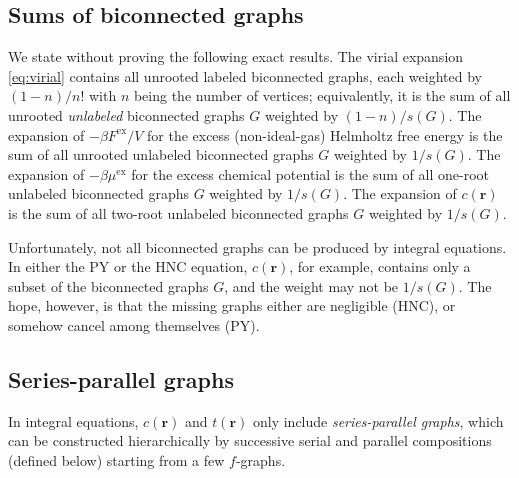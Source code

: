 \documentclass[preprint]{revtex4-1}
\newcommand{\vct}[1]{\mathbf{#1}}
\providecommand{\vr}{} %
\renewcommand{\vr}{\vct{r}}
\newcommand{\supex}[1]{ { { #1 }^{ \mathrm{ex} } } }
\newcommand{\Fex}{\supex{F}}
\newcommand{\muex}{\supex{\mu}}
\begin{document}
\subsection{\label{sec:bcsums}Sums of biconnected graphs}

We state without proving the following exact results\cite{hansen, mayer, uhlenbeck1962}.
%
The virial expansion \eqref{eq:virial} contains
  all unrooted labeled biconnected graphs,
  each weighted by $(1-n)/n!$ with $n$ being the number of vertices;
%
equivalently, it is the sum of
  all unrooted \emph{unlabeled} biconnected graphs $G$
  weighted by $(1-n)/s(G)$.
%
The expansion of $-\beta \Fex/V$
  for the excess (non-ideal-gas) Helmholtz free energy
  is the sum of all unrooted unlabeled biconnected graphs $G$
  weighted by $1/s(G)$.
%
The expansion of $-\beta \muex$ for the excess chemical potential
  is the sum of all one-root unlabeled biconnected graphs $G$
  weighted by $1/s(G)$.
%
The expansion of $c(\vr)$ is the sum of
  all two-root unlabeled biconnected graphs $G$
  weighted by $1/s(G)$.
%

Unfortunately, not all biconnected graphs can be produced by integral equations.
%
In either the PY or the HNC equation,
  $c(\vr)$, for example, contains only a subset of the biconnected graphs $G$,
  and the weight may not be $1/s(G)$.
%
The hope, however, is that the missing graphs either are negligible (HNC),
  or somehow cancel among themselves (PY).





\subsection{Series-parallel graphs}



In integral equations,
  $c(\vr)$ and $t(\vr)$
  only include
  \emph{series-parallel graphs},
%
which can be constructed
  hierarchically by successive
  serial and parallel compositions (defined below)
  starting from a few $f$-graphs\cite{eppstein1992}.
\end{document}
